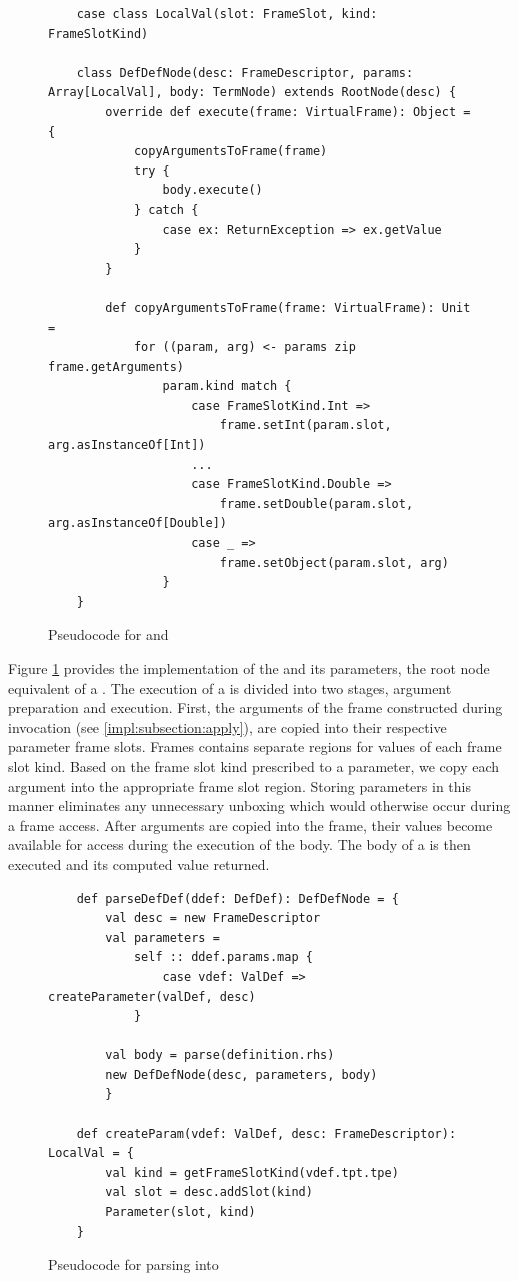 \begin{figure}[!htb]
	\begin{verbatim}
	case class LocalVal(slot: FrameSlot, kind: FrameSlotKind)
		
	class DefDefNode(desc: FrameDescriptor, params: Array[LocalVal], body: TermNode) extends RootNode(desc) {
		override def execute(frame: VirtualFrame): Object = {
			copyArgumentsToFrame(frame)
			try {
				body.execute()
			} catch {
				case ex: ReturnException => ex.getValue
			}
		}	
			
		def copyArgumentsToFrame(frame: VirtualFrame): Unit = 
			for ((param, arg) <- params zip frame.getArguments) 
				param.kind match {
					case FrameSlotKind.Int =>
						frame.setInt(param.slot, arg.asInstanceOf[Int])
					...
					case FrameSlotKind.Double =>
						frame.setDouble(param.slot, arg.asInstanceOf[Double])	
					case _ =>
						frame.setObject(param.slot, arg)
				}
	}
	\end{verbatim}
	\caption{Pseudocode for  and }
	\label{impl:defdefnode}
\end{figure}

Figure \ref{impl:defdefnode} provides the implementation of the  and its parameters, the root node equivalent of a .
The execution of a  is divided into two stages, argument preparation and execution.
First, the arguments of the frame constructed during invocation (see \ref{impl:subsection:apply}), are copied into their respective parameter frame slots.
Frames contains separate regions for values of each frame slot kind.
Based on the frame slot kind prescribed to a parameter, we copy each argument into the appropriate frame slot region.
Storing parameters in this manner eliminates any unnecessary unboxing which would otherwise occur during a frame access.
After arguments are copied into the frame, their values become available for access during the execution of the body.
The body of a  is then executed and its computed value returned.

\begin{figure}[!htb]
	\begin{verbatim}
	def parseDefDef(ddef: DefDef): DefDefNode = {
		val desc = new FrameDescriptor
		val parameters = 
			self :: ddef.params.map {
				case vdef: ValDef => createParameter(valDef, desc)
			}
			
		val body = parse(definition.rhs)
		new DefDefNode(desc, parameters, body)
		}
		
	def createParam(vdef: ValDef, desc: FrameDescriptor): LocalVal = {
		val kind = getFrameSlotKind(vdef.tpt.tpe)
		val slot = desc.addSlot(kind)
		Parameter(slot, kind)
	}
	\end{verbatim}
	\caption{Pseudocode for parsing  into }
	\label{impl:parse-defdef}
\end{figure}


